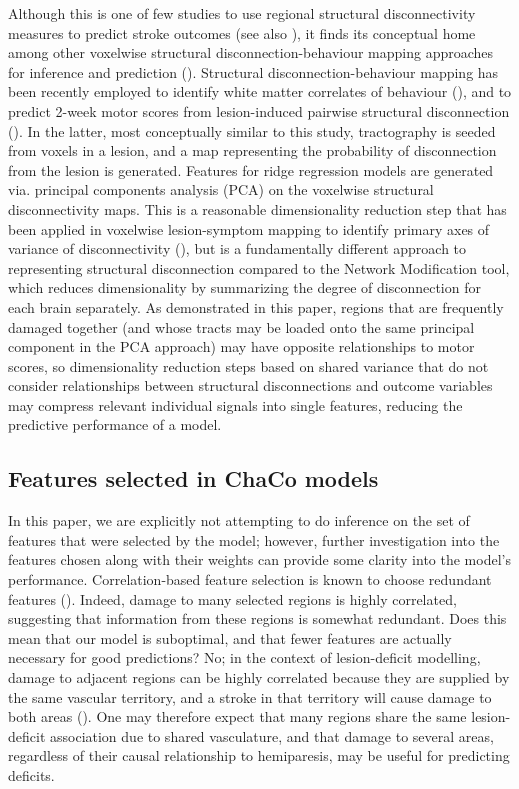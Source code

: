\documentclass[phd,tocprelim]{cornell}
\begin{document}
Although this is one of few studies to use regional structural disconnectivity measures to predict stroke outcomes (see also \cite{Tozlu2020-qa, Kuceyeski2016-vj}), it finds its conceptual home among other voxelwise structural disconnection-behaviour mapping approaches for inference and prediction (\cite{Salvalaggio2020-pe, Wawrzyniak2022-kl, Foulon2018-bj, Sperber2022-oj}). Structural disconnection-behaviour mapping has been recently employed to identify white matter correlates of behaviour (\cite{Wawrzyniak2022-kl, Foulon2018-bj}), and to predict 2-week motor scores from lesion-induced pairwise structural disconnection (\cite{Salvalaggio2020-pe}). In the latter, most conceptually similar to this study, tractography is seeded from voxels in a lesion, and a map representing the probability of disconnection from the lesion is generated. Features for ridge regression models are generated via. principal components analysis (PCA) on the voxelwise structural disconnectivity maps. This is a reasonable dimensionality reduction step that has been applied in voxelwise lesion-symptom mapping to identify primary axes of variance of disconnectivity (\cite{Ivanova2021-nh}), but is a fundamentally different approach to representing structural disconnection compared to the Network Modification tool, which reduces dimensionality by summarizing the degree of disconnection for each brain separately. As demonstrated in this paper, regions that are frequently damaged together (and whose tracts may be loaded onto the same principal component in the PCA approach) may have opposite relationships to motor scores, so dimensionality reduction steps based on shared variance that do not consider relationships between structural disconnections and outcome variables may compress relevant individual signals into single features, reducing the predictive performance of a model. 

\subsection{Features selected in ChaCo models}

In this paper, we are explicitly not attempting to do inference on the set of features that were selected by the model; however, further investigation into the features chosen along with their weights can provide some clarity into the model's performance. Correlation-based feature selection is known to choose redundant features (\cite{Guyon2003-kj}). Indeed, damage to many selected regions is highly correlated, suggesting that information from these regions is somewhat redundant. Does this mean that our model is suboptimal, and that fewer features are actually necessary for good predictions? No; in the context of lesion-deficit modelling, damage to adjacent regions can be highly correlated because they are supplied by the same vascular territory, and a stroke in that territory will cause damage to both areas (\cite{Mah2014-cb, Sperber2020-kp}). One may therefore expect that many regions share the same lesion-deficit association due to shared vasculature, and that damage to several areas, regardless of their causal relationship to hemiparesis, may be useful for predicting deficits. 
\end{document}
